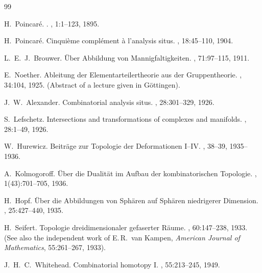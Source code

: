 \documentclass[12pt,a4paper]{article}
\begin{document}
\newpage
\begin{thebibliography}{99}

H.~Poincar{\'e}.
.
, 1:1--123, 1895.

H.~Poincar{\'e}.
\newblock Cinqui{\`e}me compl{\'e}ment {\`a} l'analysis situs.
, 18:45--110, 1904.

L.~E.~J.~Brouwer.
\newblock \"Uber Abbildung von Mannigfaltigkeiten.
, 71:97--115, 1911.

E.~Noether.
\newblock Ableitung der Elementarteilertheorie aus der Gruppentheorie.
, 34:104, 1925.
\newblock (Abstract of a lecture given in G\"ottingen).

J.~W.~Alexander.
\newblock Combinatorial analysis situs.
, 28:301--329, 1926.

S.~Lefschetz.
\newblock Intersections and transformations of complexes and manifolds.
, 28:1--49, 1926.

W.~Hurewicz.
\newblock Beitr\"age zur Topologie der Deformationen I--IV.
, 38--39, 1935--1936.

A.~Kolmogoroff.
\newblock \"Uber die Dualit\"at im Aufbau der kombinatorischen Topologie.
, 1(43):701--705, 1936.

H.~Hopf.
\newblock \"Uber die Abbildungen von Sph\"aren auf Sph\"aren niedrigerer Dimension.
, 25:427--440, 1935.

H.~Seifert.
\newblock Topologie dreidimensionaler gefaserter R\"aume.
, 60:147--238, 1933.
\newblock (See also the independent work of E.\,R.~van Kampen, {\em American Journal of Mathematics}, 55:261--267, 1933).

J.~H.~C.~Whitehead.
\newblock Combinatorial homotopy I.
, 55:213--245, 1949.


\end{thebibliography}
\end{document}
